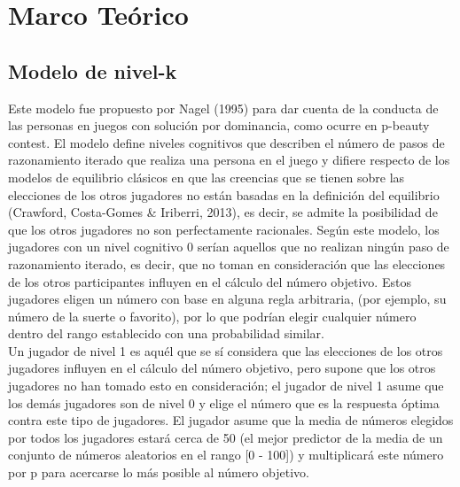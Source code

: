 \chapter{Marco Teórico} %

\label{Cap_SDT} %


\newcommand{\keyword}[1]{\textbf{#1}}
\newcommand{\tabhead}[1]{\textbf{#1}}
\newcommand{\code}[1]{\texttt{#1}}
\newcommand{\file}[1]{\texttt{\bfseries#1}}
\newcommand{\option}[1]{\texttt{\itshape#1}}


\section{Modelo de nivel-k}

Este modelo fue propuesto por Nagel (1995) para dar cuenta de la conducta de las personas en juegos con solución por dominancia, como ocurre en p-beauty contest. El modelo define niveles cognitivos que describen el número de pasos de razonamiento iterado que realiza una persona en el juego y difiere respecto de los modelos de equilibrio clásicos en que las creencias que se tienen sobre las elecciones de los otros jugadores no están basadas en la definición del equilibrio (Crawford, Costa-Gomes & Iriberri, 2013), es decir, se admite la posibilidad de que los otros jugadores no son perfectamente racionales.
Según este modelo, los jugadores con un nivel cognitivo 0 serían aquellos que no realizan ningún paso de razonamiento iterado, es decir, que no toman en consideración que las elecciones de los otros participantes inﬂuyen en el cálculo del número objetivo. Estos jugadores eligen un número con base en alguna regla arbitraria, (por ejemplo, su número de la suerte o favorito), por lo que podrían elegir cualquier número dentro del rango establecido con una probabilidad similar.\\

Un jugador de nivel 1 es aquél que se sí considera que las elecciones de los otros jugadores influyen en el cálculo del número objetivo, pero supone que los otros jugadores no han tomado esto en consideración; el jugador de nivel 1 asume que los demás jugadores son de nivel 0 y elige el número que es la respuesta óptima contra este tipo de jugadores. El jugador asume que la media de números elegidos por todos los jugadores estará cerca de 50 (el mejor predictor de la media de un conjunto de números aleatorios en el rango [0 - 100]) y multiplicará este número por p para acercarse lo más posible al número objetivo.\\

